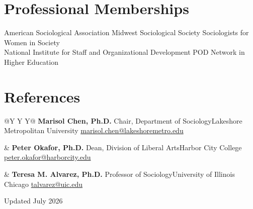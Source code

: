 \documentclass[10pt,letterpaper]{article}
\newcommand{\contactsep}{\enspace\textcolor{Gold}{\textbullet}\enspace}
\newcommand{\referenceentry}[3]{%
  \textbf{\color{Navy}#1}\newline
  #2\newline
  \href{mailto:#3}{#3}%
}
\begin{document}
\section*{Professional Memberships}

American Sociological Association \contactsep Midwest Sociological Society \contactsep Sociologists for Women in Society\\
National Institute for Staff and Organizational Development \contactsep POD Network in Higher Education

\section*{References}

\begin{tabularx}{\textwidth}{@{}Y Y Y@{}}
\referenceentry{Marisol Chen, Ph.D.}{Chair, Department of Sociology\newline Lakeshore Metropolitan University}{marisol.chen@lakeshoremetro.edu}
&
\referenceentry{Peter Okafor, Ph.D.}{Dean, Division of Liberal Arts\newline Harbor City College}{peter.okafor@harborcity.edu}
&
\referenceentry{Teresa M. Alvarez, Ph.D.}{Professor of Sociology\newline University of Illinois Chicago}{talvarez@uic.edu}
\end{tabularx}

\vfill
\begin{center}
  {\scriptsize\color{Muted}Updated July 2026}
\end{center}
\end{document}
